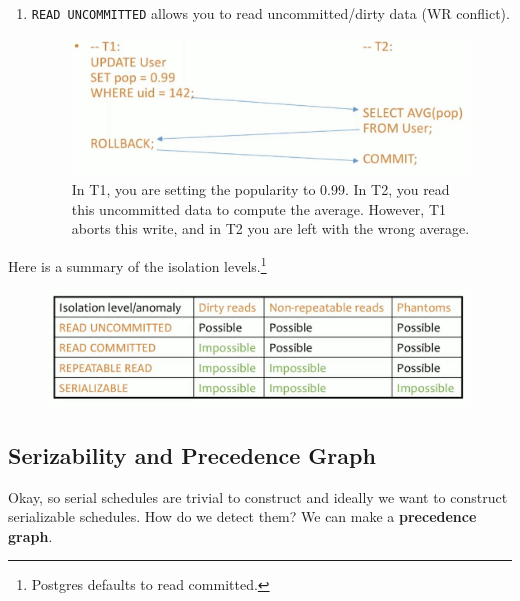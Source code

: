 \documentclass{article}
\begin{document}
\begin{enumerate}
      \item \texttt{READ UNCOMMITTED} allows you to read uncommitted/dirty data (WR conflict). 

      \begin{figure}[H]
        \centering 
        \includegraphics[scale=0.4]{img/read_unc.png}
        \caption{In T1, you are setting the popularity to 0.99. In T2, you read this uncommitted data to compute the average. However, T1 aborts this write, and in T2 you are left with the wrong average. } 
        \label{fig:read_uncommitted}
      \end{figure}
    \end{enumerate}

    Here is a summary of the isolation levels.\footnote{Postgres defaults to read committed.}

    \begin{figure}[H]
      \centering 
      \includegraphics[scale=0.4]{img/isolation.png}
      \caption{} 
      \label{fig:isolation}
    \end{figure}

  \subsection{Serizability and Precedence Graph}

    Okay, so serial schedules are trivial to construct and ideally we want to construct serializable schedules. How do we detect them? We can make a \textbf{precedence graph}. 
\end{document}
